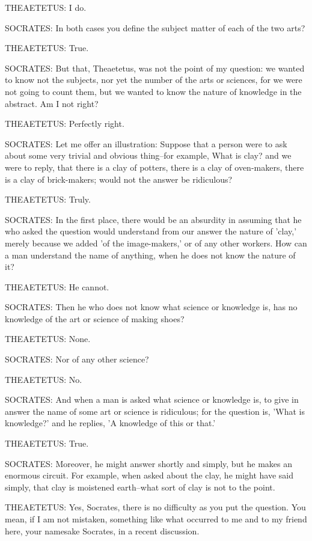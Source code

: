 THEAETETUS: I do.

SOCRATES: In both cases you define the subject matter of each of the two
arts?

THEAETETUS: True.

SOCRATES: But that, Theaetetus, was not the point of my question: we
wanted to know not the subjects, nor yet the number of the arts or
sciences, for we were not going to count them, but we wanted to know the
nature of knowledge in the abstract. Am I not right?

THEAETETUS: Perfectly right.

SOCRATES: Let me offer an illustration: Suppose that a person were to
ask about some very trivial and obvious thing--for example, What is
clay? and we were to reply, that there is a clay of potters, there is
a clay of oven-makers, there is a clay of brick-makers; would not the
answer be ridiculous?

THEAETETUS: Truly.

SOCRATES: In the first place, there would be an absurdity in assuming
that he who asked the question would understand from our answer the
nature of 'clay,' merely because we added 'of the image-makers,' or of
any other workers. How can a man understand the name of anything, when
he does not know the nature of it?

THEAETETUS: He cannot.

SOCRATES: Then he who does not know what science or knowledge is, has no
knowledge of the art or science of making shoes?

THEAETETUS: None.

SOCRATES: Nor of any other science?

THEAETETUS: No.

SOCRATES: And when a man is asked what science or knowledge is, to
give in answer the name of some art or science is ridiculous; for the
question is, 'What is knowledge?' and he replies, 'A knowledge of this
or that.'

THEAETETUS: True.

SOCRATES: Moreover, he might answer shortly and simply, but he makes an
enormous circuit. For example, when asked about the clay, he might have
said simply, that clay is moistened earth--what sort of clay is not to
the point.

THEAETETUS: Yes, Socrates, there is no difficulty as you put the
question. You mean, if I am not mistaken, something like what occurred
to me and to my friend here, your namesake Socrates, in a recent
discussion.

